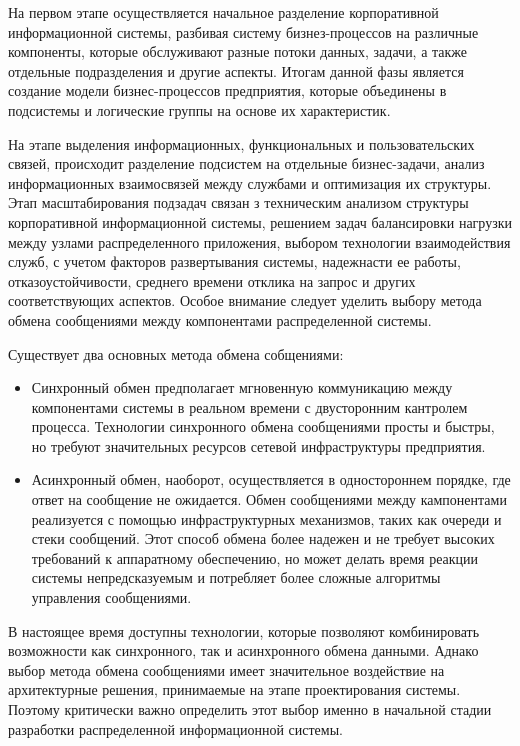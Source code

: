 \documentclass[report, draught]{fefudoc}
\begin{document}
На первом этапе осуществляется начальное разделение корпоративной информационной системы, разбивая систему бизнез-процессов на различные компоненты, которые обслуживают разные потоки данных, задачи, а также отдельные подразделения и другие аспекты. Итогам данной фазы является создание модели бизнес-процессов предприятия, которые объединены в подсистемы и логические группы на основе их характеристик.

На этапе выделения информационных, функциональных и пользовательских связей, происходит разделение подсистем на отдельные бизнес-задачи, анализ информационных взаимосвязей между службами и оптимизация их структуры. Этап масштабирования подзадач связан з техническим анализом структуры корпоративной информационной системы, решением задач балансировки нагрузки между узлами распределенного приложения, выбором технологии взаимодействия служб, с учетом факторов развертывания системы, надежнасти ее работы, отказоустойчивости, среднего времени отклика на запрос и других соответствующих аспектов. Особое внимание следует уделить выбору метода обмена сообщениями между компонентами распределенной системы.

Существует два основных метода обмена собщениями:

\begin{itemize}
\item Синхронный обмен предполагает мгновенную коммуникацию между компонентами системы в реальном времени с двусторонним кантролем процесса. Технологии синхронного обмена сообщениями просты и быстры, но требуют значительных ресурсов сетевой инфраструктуры предприятия.
\item Асинхронный обмен, наоборот, осуществляется в одностороннем порядке, где ответ на сообщение не ожидается. Обмен сообщениями между кампонентами реализуется с помощью инфраструктурных механизмов, таких как очереди и стеки сообщений. Этот способ обмена более надежен и не требует высоких требований к аппаратному обеспечению, но может делать время реакции системы непредсказуемым и потребляет более сложные алгоритмы управления сообщениями.
\end{itemize}

В настоящее время доступны технологии, которые позволяют комбинировать возможности как синхронного, так и асинхронного обмена данными. Аднако выбор метода обмена сообщениями имеет значительное воздействие на архитектурные решения, принимаемые на этапе проектирования системы. Поэтому критически важно определить этот выбор именно в начальной стадии разработки распределенной информационной системы.
\end{document}
